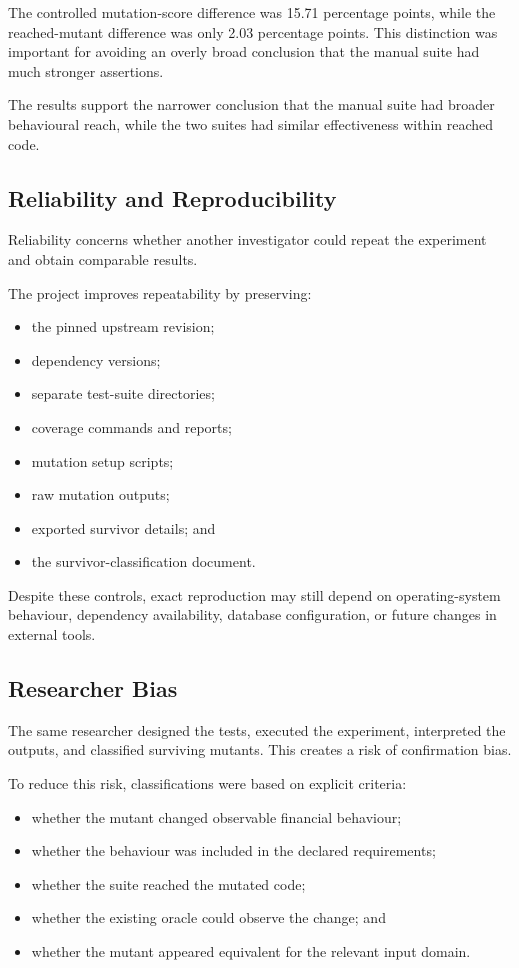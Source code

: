 \documentclass[12pt]{article}
\begin{document}
The controlled mutation-score difference was 15.71 percentage points, while
the reached-mutant difference was only 2.03 percentage points. This distinction
was important for avoiding an overly broad conclusion that the manual suite
had much stronger assertions.

The results support the narrower conclusion that the manual suite had broader
behavioural reach, while the two suites had similar effectiveness within
reached code.

\subsection{Reliability and Reproducibility}

Reliability concerns whether another investigator could repeat the experiment
and obtain comparable results.

The project improves repeatability by preserving:

\begin{itemize}
    \item the pinned upstream revision;
    \item dependency versions;
    \item separate test-suite directories;
    \item coverage commands and reports;
    \item mutation setup scripts;
    \item raw mutation outputs;
    \item exported survivor details; and
    \item the survivor-classification document.
\end{itemize}

Despite these controls, exact reproduction may still depend on operating-system
behaviour, dependency availability, database configuration, or future changes
in external tools.

\subsection{Researcher Bias}

The same researcher designed the tests, executed the experiment, interpreted
the outputs, and classified surviving mutants. This creates a risk of
confirmation bias.

To reduce this risk, classifications were based on explicit criteria:

\begin{itemize}
    \item whether the mutant changed observable financial behaviour;
    \item whether the behaviour was included in the declared requirements;
    \item whether the suite reached the mutated code;
    \item whether the existing oracle could observe the change; and
    \item whether the mutant appeared equivalent for the relevant input
          domain.
\end{itemize}
\end{document}
